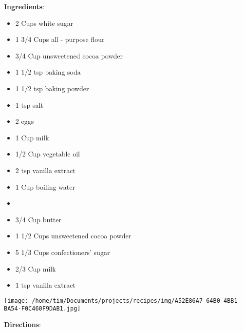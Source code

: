 \documentclass[11pt, twoside, openany]{book}
\begin{document}
\begin{minipage}[t]{0.8\linewidth}
\textbf{Ingredients}:\vspace{-3mm}
\begin{multicols}{2}
\begin{itemize}\setlength\itemsep{-1mm}
\item 2 Cups white sugar
\item 1 3/4 Cups all - purpose flour
\item 3/4 Cup unsweetened cocoa powder
\item 1 1/2 tsp baking soda
\item 1 1/2 tsp baking powder
\item 1 tsp salt
\item 2 eggs
\item 1 Cup milk
\item 1/2 Cup vegetable oil
\item 2 tsp vanilla extract
\item 1 Cup boiling water
\item  
\item 3/4 Cup butter
\item 1 1/2 Cups unsweetened cocoa powder
\item 5 1/3 Cups confectioners' sugar
\item 2/3 Cup milk
\item 1 tsp vanilla extract
\end{itemize}
\end{multicols}
\end{minipage}
\begin{minipage}[t]{0.2\linewidth}
\centering \strut\vspace*{-\baselineskip}\newline
\texttt{[image: /home/tim/Documents/projects/recipes/img/A52E86A7-64B0-4BB1-BA54-F0C460F9DAB1.jpg]}\\
\end{minipage}\vspace{3mm}
\textbf{Directions}:
\end{document}
